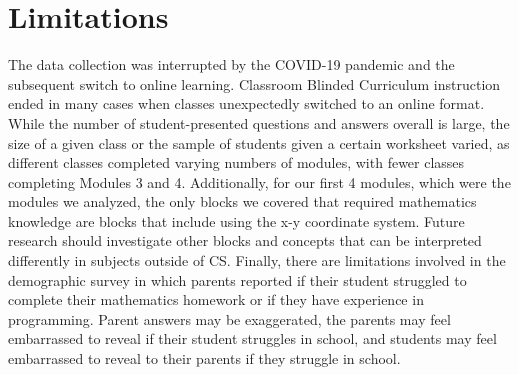 \documentclass[sigconf,manuscript,review,anonymous]{acmart} %
\def\ts{TIPP\&SEE}
\newcommand{\Scratchencore}[0]{Blinded Curriculum}
\begin{document}
\section{Limitations}
\label{sec:limits}
The data collection was interrupted by the COVID-19 pandemic and the subsequent switch to online learning. Classroom \Scratchencore{} instruction ended in many cases when classes unexpectedly switched to an online format. While the number of student-presented questions and answers overall is large, the size of a given class or the sample of students given a certain worksheet varied, as different classes completed varying numbers of modules, with fewer classes completing Modules 3 and 4. Additionally, for our first 4 modules, which were the modules we analyzed, the only blocks we covered that required mathematics knowledge are blocks that include using the x-y coordinate system. Future research should investigate other blocks and concepts that can be interpreted differently in subjects outside of CS.%
Finally, there are limitations involved in the demographic survey in which parents reported if their student struggled to complete their mathematics homework or if they have experience in programming. Parent answers may be exaggerated, the parents may feel embarrassed to reveal if their student struggles in school, and students may feel embarrassed to reveal to their parents if they struggle in school.
\end{document}
